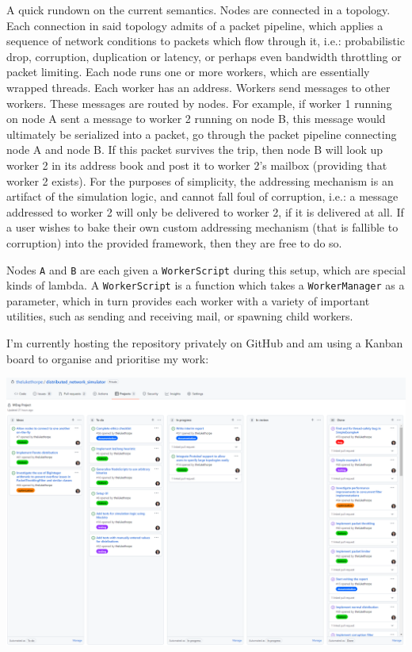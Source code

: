 A quick rundown on the current semantics. Nodes are connected in a topology. Each connection in said topology admits
of a packet pipeline, which applies a sequence of network conditions to packets which flow through it, i.e.:
probabilistic drop, corruption, duplication or latency, or perhaps even bandwidth throttling or packet limiting. Each
node runs one or more workers, which are essentially wrapped threads. Each worker has an address. Workers send
messages to other workers. These messages are routed by nodes. For example, if worker 1 running on node A sent a
message to worker 2 running on node B, this message would ultimately be serialized into a packet, go through the packet
pipeline connecting node A and node B. If this packet survives the trip, then node B will look up worker 2 in its
address book and post it to worker 2's mailbox (providing that worker 2 exists). For the purposes of simplicity, the
addressing mechanism is an artifact of the simulation logic, and cannot fall foul of corruption, i.e.: a message
addressed to worker 2 will only be delivered to worker 2, if it is delivered at all. If a user wishes to bake their
own custom addressing mechanism (that is fallible to corruption) into the provided framework, then they are free to
do so.

Nodes \texttt{A} and \texttt{B} are each given a \texttt{WorkerScript} during this setup, which are special kinds of
lambda. A \texttt{WorkerScript} is a function which takes a \texttt{WorkerManager} as a parameter, which in turn
provides each worker with a variety of important utilities, such as sending and receiving mail, or spawning child
workers.

I'm currently hosting the repository privately on GitHub and am using a Kanban board to organise and prioritise my work:

\begin{center}
    \includegraphics[width=\textwidth]{images/interim_kanban_board}
\end{center}

